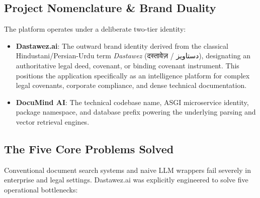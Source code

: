 \documentclass[11pt,a4paper]{article}
\begin{document}
\subsection{Project Nomenclature \& Brand Duality}
The platform operates under a deliberate two-tier identity:
\begin{itemize}[leftmargin=*]
    \item \textbf{Dastawez.ai}: The outward brand identity derived from the classical Hindustani/Persian-Urdu term \textit{Dastawez} (\foreignlanguage{english}{दस्तावेज़} / \foreignlanguage{english}{دستاویز}), designating an authoritative legal deed, covenant, or binding covenant instrument. This positions the application specifically as an intelligence platform for complex legal covenants, corporate compliance, and dense technical documentation.
    \item \textbf{DocuMind AI}: The technical codebase name, ASGI microservice identity, package namespace, and database prefix powering the underlying parsing and vector retrieval engines.
\end{itemize}

\subsection{The Five Core Problems Solved}
Conventional document search systems and naive LLM wrappers fail severely in enterprise and legal settings. Dastawez.ai was explicitly engineered to solve five operational bottlenecks:
\end{document}

